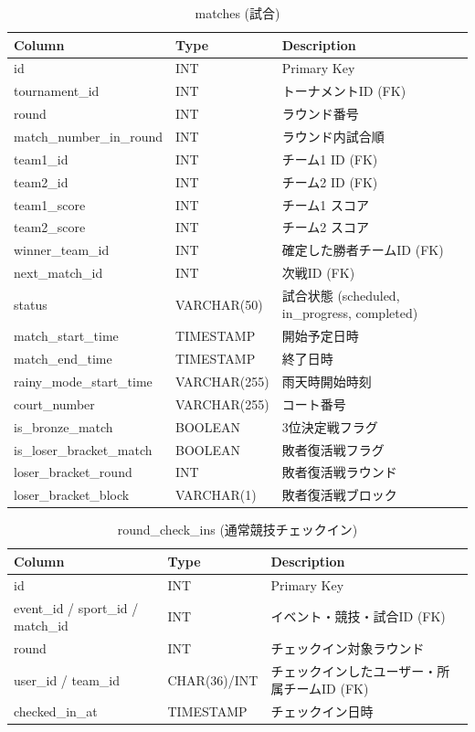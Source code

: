 \documentclass[paper=a4, fontsize=11pt]{jlreq}
\begin{document}
\begin{table}[H]
    \centering
    \caption{matches (試合)}
    \begin{tabularx}{\textwidth}{|l|l|X|}
        \toprule
        Column & Type & Description \\
        \midrule
        id & INT & Primary Key \\
        tournament\_id & INT & トーナメントID (FK) \\
        round & INT & ラウンド番号 \\
        match\_number\_in\_round & INT & ラウンド内試合順 \\
        team1\_id & INT & チーム1 ID (FK) \\
        team2\_id & INT & チーム2 ID (FK) \\
        team1\_score & INT & チーム1 スコア \\
        team2\_score & INT & チーム2 スコア \\
        winner\_team\_id & INT & 確定した勝者チームID (FK) \\
        next\_match\_id & INT & 次戦ID (FK) \\
        status & VARCHAR(50) & 試合状態 (scheduled, in\_progress, completed) \\
        match\_start\_time & TIMESTAMP & 開始予定日時 \\
        match\_end\_time & TIMESTAMP & 終了日時 \\
        rainy\_mode\_start\_time & VARCHAR(255) & 雨天時開始時刻 \\
        court\_number & VARCHAR(255) & コート番号 \\
        is\_bronze\_match & BOOLEAN & 3位決定戦フラグ \\
        is\_loser\_bracket\_match & BOOLEAN & 敗者復活戦フラグ \\
        loser\_bracket\_round & INT & 敗者復活戦ラウンド \\
        loser\_bracket\_block & VARCHAR(1) & 敗者復活戦ブロック \\
        \bottomrule
    \end{tabularx}
\end{table}

\begin{table}[H]
    \centering
    \caption{round\_check\_ins (通常競技チェックイン)}
    \begin{tabularx}{\textwidth}{|l|l|X|}
        \toprule
        Column & Type & Description \\
        \midrule
        id & INT & Primary Key \\
        event\_id / sport\_id / match\_id & INT & イベント・競技・試合ID (FK) \\
        round & INT & チェックイン対象ラウンド \\
        user\_id / team\_id & CHAR(36)/INT & チェックインしたユーザー・所属チームID (FK) \\
        checked\_in\_at & TIMESTAMP & チェックイン日時 \\
        \bottomrule
    \end{tabularx}
\end{table}
\end{document}
